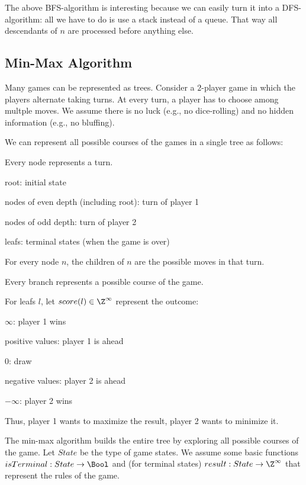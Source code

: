 The above BFS-algorithm is interesting because we can easily turn it into a DFS-algorithm: all we have to do is use a stack instead of a queue.
That way all descendants of $n$ are processed before anything else.

\subsection{Min-Max Algorithm}\label{sec:ad:minmax}

Many games can be represented as trees.
Consider a $2$-player game in which the players alternate taking turns.
At every turn, a player has to choose among multple moves.
We assume there is no luck (e.g., no dice-rolling) and no hidden information (e.g., no bluffing).

We can represent all possible courses of the games in a single tree as follows:
\begin{compactitem}
 \item Every node represents a turn.
  \begin{compactitem}
    \item root: initial state
    \item nodes of even depth (including root): turn of player 1
    \item nodes of odd depth: turn of player 2
    \item leafs: terminal states (when the game is over)
  \end{compactitem}
 \item For every node $n$, the children of $n$ are the possible moves in that turn.
 \item Every branch represents a possible course of the game.
\end{compactitem}

For leafs $l$, let $score(l)\in\Z^\infty$ represent the outcome:
\begin{compactitem}
 \item $\infty$: player 1 wins
 \item positive values: player 1 is ahead
 \item $0$: draw
 \item negative values: player 2 is ahead
 \item $-\infty$: player 2 wins
\end{compactitem}
Thus, player 1 wants to maximize the result, player 2 wants to minimize it.

The min-max algorithm builds the entire tree by exploring all possible courses of the game.
Let $State$ be the type of game states.
We assume some basic functions $isTerminal:State\to\Bool$ and (for terminal states) $result:State\to\Z^\infty$ that represent the rules of the game.

